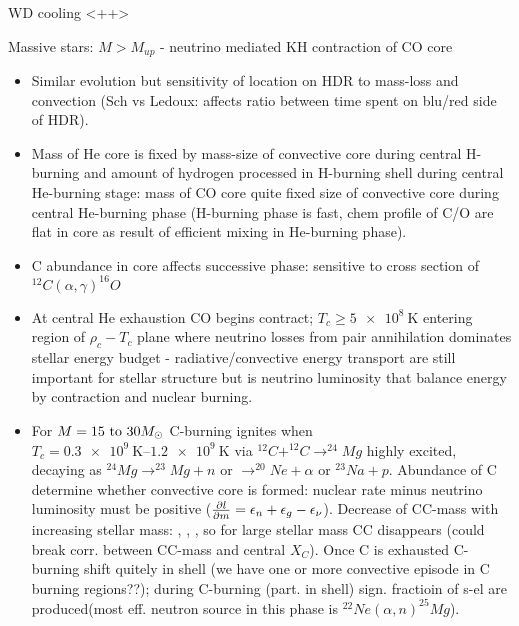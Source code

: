 \begin{frame}{WD cooling}
    <++>
\end{frame}

\begin{frame}{Massive stars: $M>M_{up}$ - neutrino mediated KH contraction of CO core}
    \begin{itemize}
        \item Similar evolution but sensitivity of location on HDR to mass-loss and convection (Sch vs Ledoux: affects ratio between time spent on blu/red side of HDR).
        \item Mass of He core is fixed by mass-size of convective core during central H-burning and amount of hydrogen processed in H-burning shell during central He-burning stage: mass of CO core quite fixed size of convective core during central He-burning phase (H-burning phase is fast, chem profile of C/O are flat in core as result of efficient mixing in He-burning phase).
        \item C abundance in core affects successive phase: sensitive to cross section of $^{12}C(\alpha,\gamma)^{16}O$
        \item At central He exhaustion CO begins contract; $T_c\geq\SI{5e8}{\kelvin}$ entering region of $\rho_c-T_c$ plane where neutrino losses from pair annihilation dominates stellar energy budget - radiative/convective energy transport are still important for stellar structure but is neutrino luminosity that balance energy by contraction and nuclear burning.
        \item For $M=\numrange{15}{30}\msun{}$ C-burning ignites when $T_c=\SIrange{0.3e9}{1.2e9}{\kelvin}$ via $^{12}C+^{12}C\to^{24}Mg$ highly excited, decaying as $^{24}Mg\to^{23}Mg+n$ or $\to^{20}Ne+\alpha$ or $^{23}Na+p$. Abundance of C determine whether convective core is formed: nuclear rate minus neutrino luminosity must be positive ($\PDy{m}{l}=\epsilon_n+\epsilon_g-\epsilon_{\nu}$). Decrease of CC-mass with increasing stellar mass: , , \xaumenta{\epsilon_{\nu}}, so for large stellar mass CC disappears (could break corr. between CC-mass and central $X_C$). Once C is exhausted C-burning shift quitely in shell (we have one or more convective episode in C burning regions??); during C-burning (part. in shell) sign. fractioin of s-el are produced(most eff. neutron source in this phase is $^{22}Ne(\alpha,n)^{25}Mg$).
    \end{itemize}
\end{frame}

